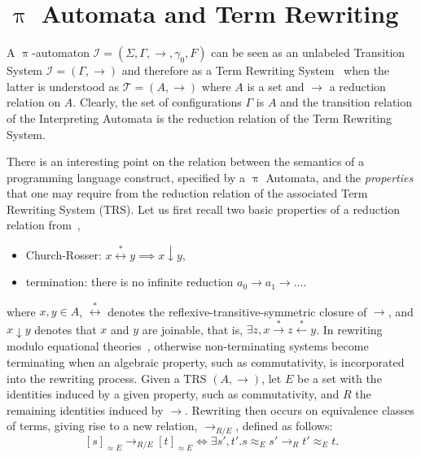 \documentclass[a4paper,openany]{book}
\begin{document}
     
\section{$\uppi$ Automata and Term Rewriting}\label{sec:gia-and-trs}

A $\uppi$-automaton $\mathcal{I} = (\Sigma, \Gamma, \rightarrow, \gamma_0, F)$ 
can be seen as an unlabeled Transition System $\mathcal{I} = (\Gamma, \rightarrow)$ and therefore  
as a Term Rewriting
System~\cite{Baader:1998:TR:280474} when the latter is understood as
$\mathcal{T} = (A, \longrightarrow)$ where $A$ is a set and $\longrightarrow$ a
reduction relation on $A$. Clearly, the set of configurations $\Gamma$ is $A$
and the transition relation of the Interpreting Automata is the
reduction relation of the Term Rewriting System.

There is an interesting point on the relation between the
semantics of a programming language construct, specified by a
$\uppi$ Automata, and the \emph{properties} that one
may require from the reduction relation of the associated Term
Rewriting System (TRS). Let us first recall two basic properties of a reduction relation
from~\cite[Def.2.1.3]{Baader:1998:TR:280474},
\begin{itemize}
\item Church-Rosser: $x \stackrel{*}{\longleftrightarrow} y \implies x
  \downarrow y$,
\item termination: there is no infinite reduction $a_0 \rightarrow a_1
  \rightarrow \ldots$.
\end{itemize}
where $x, y \in A$, $\stackrel{*}{\longleftrightarrow}$ denotes the
reflexive-transitive-symmetric closure of $\longrightarrow$, and
$x \downarrow y$ denotes that $x$ and $y$ are joinable, that is,
$\exists z, x \stackrel{*}{\longrightarrow} z
\stackrel{*}\longleftarrow y$.  In rewriting modulo equational
theories~\cite[Ch. 11]{Baader:1998:TR:280474}, otherwise
non-terminating systems become terminating when an algebraic property,
such as commutativity, is incorporated into the rewriting process. Given a
TRS $(A, \longrightarrow)$, let $E$ be a set with
the identities induced by a given property, such as commutativity, and
$R$ the remaining identities induced by $\longrightarrow$. Rewriting
then occurs on equivalence classes of terms, giving rise to a new
relation, $\longrightarrow_{R/E}$, defined as follows:
$$
[s]_{\approx E} \longrightarrow_{R/E} [t]_{\approx E} \Leftrightarrow
\exists s', t'. s \approx_E s' \longrightarrow_R t' \approx_E t.
$$
\end{document}

